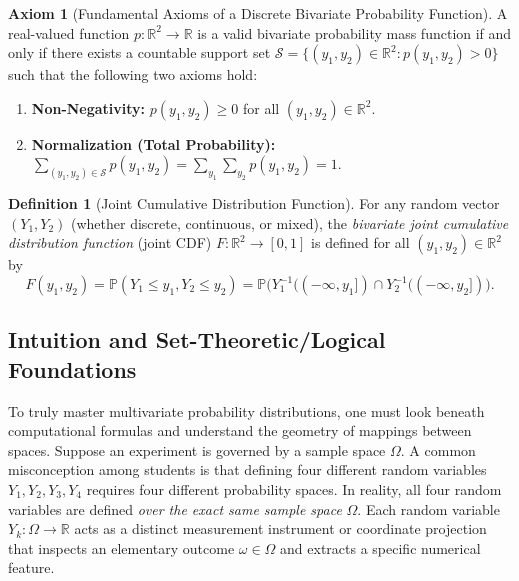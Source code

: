 \documentclass[11pt, letterpaper]{article}
\theoremstyle{definition}
\newtheorem{definition}{Definition}[section]
\newtheorem{axiom}{Axiom}[section]
\theoremstyle{remark}
\newcommand{\R}{\mathbb{R}}
\newcommand{\Prob}{\mathbb{P}}
\begin{document}
\begin{axiom}[Fundamental Axioms of a Discrete Bivariate Probability Function]
A real-valued function $p : \R^2 \to \R$ is a valid bivariate probability mass function if and only if there exists a countable support set $\mathcal{S} = \{(y_1, y_2) \in \R^2 : p(y_1, y_2) > 0\}$ such that the following two axioms hold:
\begin{enumerate}[label=\textbf{(A\arabic*)}]
    \item \textbf{Non-Negativity:} $p(y_1, y_2) \ge 0$ for all $(y_1, y_2) \in \R^2$.
    \item \textbf{Normalization (Total Probability):} $\displaystyle \sum_{(y_1, y_2) \in \mathcal{S}} p(y_1, y_2) = \sum_{y_1} \sum_{y_2} p(y_1, y_2) = 1$.
\end{enumerate}
\end{axiom}

\begin{definition}[Joint Cumulative Distribution Function]
For any random vector $(Y_1, Y_2)$ (whether discrete, continuous, or mixed), the \emph{bivariate joint cumulative distribution function} (joint CDF) $F : \R^2 \to [0, 1]$ is defined for all $(y_1, y_2) \in \R^2$ by
\[
F(y_1, y_2) = \Prob(Y_1 \le y_1, Y_2 \le y_2) = \Prob\bigl(Y_1^{-1}((-\infty, y_1]) \cap Y_2^{-1}((-\infty, y_2])\bigr).
\]
\end{definition}

\subsection{Intuition and Set-Theoretic/Logical Foundations}

To truly master multivariate probability distributions, one must look beneath computational formulas and understand the geometry of mappings between spaces. Suppose an experiment is governed by a sample space $\Omega$. A common misconception among students is that defining four different random variables $Y_1, Y_2, Y_3, Y_4$ requires four different probability spaces. In reality, all four random variables are defined \emph{over the exact same sample space} $\Omega$. Each random variable $Y_k : \Omega \to \R$ acts as a distinct measurement instrument or coordinate projection that inspects an elementary outcome $\omega \in \Omega$ and extracts a specific numerical feature.
\end{document}
